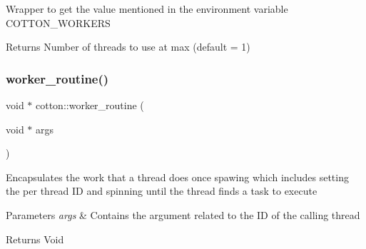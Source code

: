 Wrapper to get the value mentioned in the environment variable C\+O\+T\+T\+O\+N\+\_\+\+W\+O\+R\+K\+E\+RS

\begin{DoxyReturn}{Returns}
Number of threads to use at max (default = 1) 
\end{DoxyReturn}
\mbox{\label{cotton-runtime_8h_file_a361c34063ecb68cf02d417074decb12b}} 
\subsubsection{\texorpdfstring{worker\+\_\+routine()}{worker\_routine()}}
{\footnotesize\ttfamily void $\ast$ cotton\+::worker\+\_\+routine (\begin{DoxyParamCaption}\item[{void $\ast$}]{args }\end{DoxyParamCaption})}

Encapsulates the work that a thread does once spawing which includes setting the per thread ID and spinning until the thread finds a task to execute


\begin{DoxyParams}{Parameters}
{\em args} & Contains the argument related to the ID of the calling thread \\
\hline
\end{DoxyParams}
\begin{DoxyReturn}{Returns}
Void 
\end{DoxyReturn}
